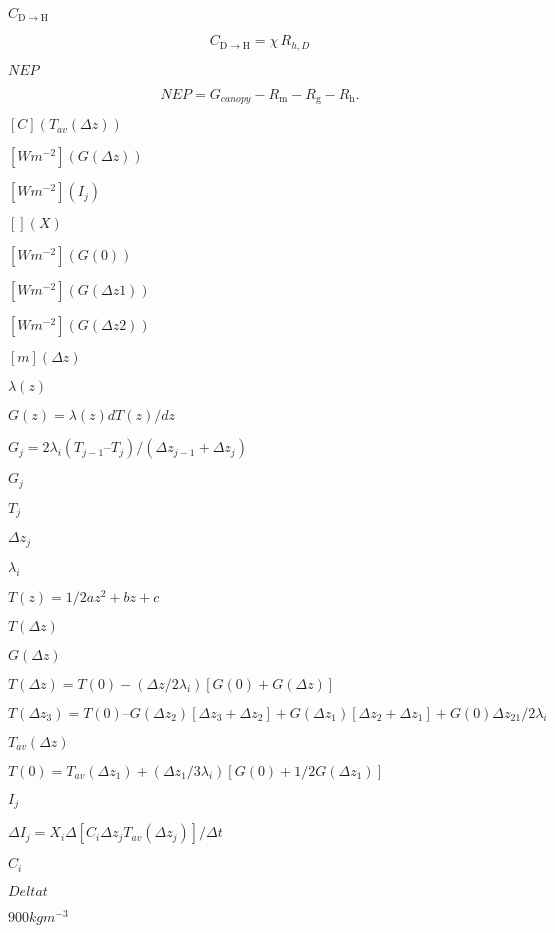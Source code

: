 \documentclass{article}
\begin{document}
{$C_{\mathrm{D} \rightarrow \mathrm{H}}$
\pagebreak

\[ \label{cdtoh} C_{\mathrm{D} \rightarrow \mathrm{H}} = \chi\,R_{h,D} \]
\pagebreak

$NEP$
\pagebreak

\[ NEP = G_{canopy} - R_\mathrm{m} - R_\mathrm{g} - R_\mathrm{h}. \]
\pagebreak

$[C] (T_{av}( \Delta z))$
\pagebreak

$[W m^{-2}] (G(\Delta z))$
\pagebreak

$[W m^{-2}] (I_j) $
\pagebreak

$[ ] (X)$
\pagebreak

$[W m^{-2}] (G(0))$
\pagebreak

$[W m^{-2}] (G(\Delta z1))$
\pagebreak

$[W m^{-2}] (G(\Delta z2))$
\pagebreak

$[m] (\Delta z)$
\pagebreak

$\lambda(z)$
\pagebreak

$G(z) = \lambda(z) dT(z)/dz$
\pagebreak

$G_j = 2 \lambda_i (T_{j-1} – T_j) / (\Delta z_{j-1} + \Delta z_j)$
\pagebreak

$G_j$
\pagebreak

$T_j$
\pagebreak

$\Delta z_j$
\pagebreak

$\lambda_i$
\pagebreak

$T(z) = 1/2 a z^2 + b z +c$
\pagebreak

$T(\Delta z)$
\pagebreak

$G(\Delta z)$
\pagebreak

$T(\Delta z) = T(0) - (\Delta z/ 2 \lambda_i)[G(0) + G(\Delta z)]$
\pagebreak

$T(\Delta z_3) = T(0) – {G(\Delta z_2) [\Delta z_3 + \Delta z_2] + G(\Delta z_1) [\Delta z_2 + \Delta z_1] + G(0) \Delta z_{21}} / 2 \lambda_i$
\pagebreak

$T_{av}(\Delta z)$
\pagebreak

$T(0) = T_{av}(\Delta z_1) + (\Delta z_1/ 3\lambda_i) [G(0) + 1/2 G(\Delta z_1)]$
\pagebreak

$I_j$
\pagebreak

$\Delta I_j = X_i \Delta[C_i \Delta z_j T_{av}(\Delta z_j)]/ \Delta t$
\pagebreak

$C_i$
\pagebreak

$Delta t$
\pagebreak

$900 kg m^{-3}$
\pagebreak

}
\end{document}
